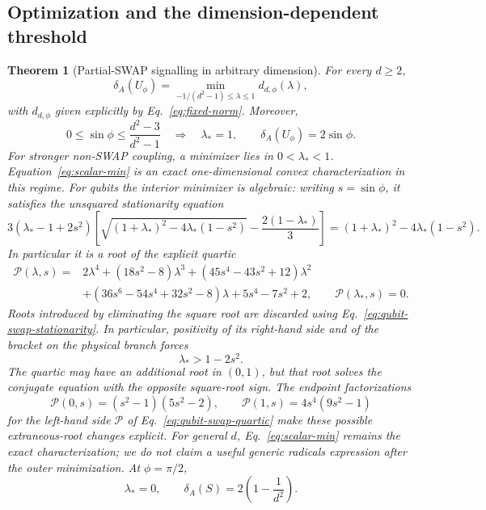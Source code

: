 \documentclass[11pt,a4paper]{article}
\newtheorem{theorem}{Theorem}
\theoremstyle{remark}
\begin{document}
\subsection{Optimization and the dimension-dependent threshold}

\begin{theorem}[Partial-SWAP signalling in arbitrary dimension]
\label{thm:partial-swap}
For every $d\geq2$,
\begin{equation}
 \delta_A(U_\phi)
 =\min_{-1/(d^2-1)\leq\lambda\leq1}d_{d,\phi}(\lambda),
 \label{eq:scalar-min}
\end{equation}
with $d_{d,\phi}$ given explicitly by Eq.~\eqref{eq:fixed-norm}.  Moreover,
\begin{equation}
 0\leq\sin\phi\leq\frac{d^2-3}{d^2-1}
 \quad\Longrightarrow\quad
 \lambda_*=1,\qquad
 \delta_A(U_\phi)=2\sin\phi.
 \label{eq:weak-branch}
\end{equation}
For stronger non-SWAP coupling, a minimizer lies in $0<\lambda_*<1$.
Equation~\eqref{eq:scalar-min} is an exact one-dimensional convex
characterization in this regime.  For qubits the interior minimizer is
algebraic: writing $s=\sin\phi$, it satisfies the unsquared stationarity
equation
\begin{equation}
 3(\lambda_*-1+2s^2)
 \left[\sqrt{(1+\lambda_*)^2-4\lambda_*(1-s^2)}
       -\frac{2(1-\lambda_*)}{3}\right]
 =(1+\lambda_*)^2-4\lambda_*(1-s^2).
 \label{eq:qubit-swap-stationarity}
\end{equation}
In particular it is a root of the explicit quartic
\begin{align}
 \mathcal P(\lambda,s)={}&2\lambda^4+(18s^2-8)\lambda^3
 +(45s^4-43s^2+12)\lambda^2\nonumber\\
 &+(36s^6-54s^4+32s^2-8)\lambda
 +5s^4-7s^2+2,\qquad
 \mathcal P(\lambda_*,s)=0.
 \label{eq:qubit-swap-quartic}
\end{align}
Roots introduced by eliminating the square root are discarded using
Eq.~\eqref{eq:qubit-swap-stationarity}.  In particular, positivity of its
right-hand side and of the bracket on the physical branch forces
\begin{equation}
 \lambda_*>1-2s^2.
 \label{eq:qubit-swap-selector}
\end{equation}
The quartic may have an additional root in $(0,1)$, but that root solves the
conjugate equation with the opposite square-root sign.  The endpoint
factorizations
\[
 \mathcal P(0,s)=(s^2-1)(5s^2-2),\qquad
 \mathcal P(1,s)=4s^4(9s^2-1)
\]
for the left-hand side $\mathcal P$ of
Eq.~\eqref{eq:qubit-swap-quartic} make these possible extraneous-root changes
explicit.  For general $d$, Eq.~\eqref{eq:scalar-min} remains the exact
characterization; we do not claim a useful generic radicals expression after
the outer minimization.
At $\phi=\pi/2$,
\begin{equation}
 \lambda_*=0,\qquad
 \delta_A(S)=2\left(1-\frac1{d^2}\right).
 \label{eq:swap-d}
\end{equation}
\end{theorem}
\end{document}
